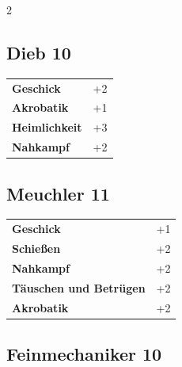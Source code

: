 \begin{multicols}{2}
\begin{tcolorbox}
\end{tcolorbox}

\begin{tcolorbox}
    \subsection*{Dieb \hfill \small{10 }}
    \tcblower




\begin{tabular}{@{}ll@{}}
    \textbf{Geschick} & +2\\
    \textbf{Akrobatik} & +1\\
    \textbf{Heimlichkeit} & +3\\
    \textbf{Nahkampf} & +2\\
\end{tabular}


\end{tcolorbox}

\begin{tcolorbox}
    \subsection*{Meuchler \hfill \small{11 }}
    \tcblower




\begin{tabular}{@{}ll@{}}
    \textbf{Geschick} & +1\\
    \textbf{Schießen} & +2\\
    \textbf{Nahkampf} & +2\\
    \textbf{Täuschen und Betrügen} & +2\\
    \textbf{Akrobatik} & +2\\
\end{tabular}


\end{tcolorbox}

\begin{tcolorbox}
    \subsection*{Feinmechaniker \hfill \small{10 }}
    \tcblower





\end{tcolorbox}
\end{multicols}
